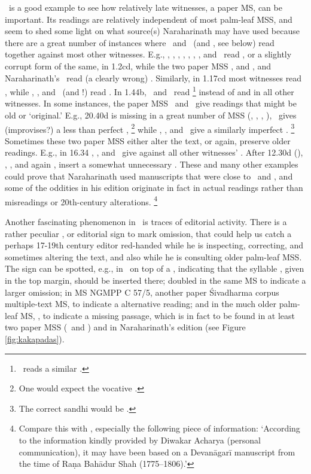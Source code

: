 \msPaperA\ is a good example to see how relatively
late witnesses, a paper MS, can be important. Its readings
are relatively independent of most palm-leaf MSS,
and seem to shed some light on what source(s) 
Naraharinath may have used because there
are a great number of instances where \Ed\ and \msPaperA\
(and \msPaperC, see below) 
read together against most other witnesses. E.g., \msCa, \msCb, \msCc, \msNa, \msNb, \msNc, \msNd, 
and \msM\ read \skt{bhāratasaṃhitām}, or a slightly
corrupt form of the same, in 1.2cd, while the two
paper MSS \msPaperA, and \msPaperC, 
and Naraharinath's \Ed\ read (a clearly wrong)
. Similarly, in 1.17cd most
witnesses read , while 
\msPaperA, \msPaperC, and \Ed\ (and \msM!) read
. In 1.44b, \msPaperA\ and
\Ed\ read %
		\footnote{\msPaperC\ reads a similar
					.}
instead of  and  
in all other witnesses.
In some instances, the paper
MSS \msPaperA\ and \msPaperC\ give readings
that might be old or `original.' E.g., 20.40d is missing
in a great number of MSS (\msCa, \msCb, \msNa, \msNb),
\msNc\ gives (improvises?) a less than perfect 
,%
		 \footnote{One would expect the vocative
		 				.}
while \msPaperA, \msPaperC, and \Ed\ give a similarly imperfect
.%
		 \footnote{The correct sandhi would be
		 				.}
Sometimes these two paper MSS either alter
the text, or again, preserve older readings. 
E.g., in 16.34 \msPaperA, \msPaperC, and \Ed\
give  against all other witnesses'
\skt{maheśvara uvāca}. After 12.30d (),
\msPaperA, \msPaperC, and again \Ed, insert
a somewhat unnecessary \skt{vipula uvāca}. These
and many other examples could prove that
Naraharinath used manuscripts that were close
to \msPaperA\ and \msPaperC,\label{narahari_paperms}
and some of the oddities in his edition originate in fact in 
actual readings rather than misreadings or
20th-century alterations.%
		\footnote{Compare this with 	
					, especially the
					following piece of information:
					`According to the information kindly
					provided by Diwakar Acharya (personal communication),
					it may have been based on a Devanāgarī manuscript 	
					from the time of Raṇa Bahādur Shah (1775--1806).'}

Another fascinating phenomenon in \msPaperA\ is
traces of editorial activity. There is a rather
peculiar \skt{kākapada}, or editorial sign to mark
omission, that could help us catch a perhaps
17-19th century editor red-handed while he is inspecting,
correcting, and sometimes altering the text, and 
also while he is consulting older palm-leaf MSS.
The sign can be spotted, e.g., in \msPaperA\
on top of a , indicating that the syllable , 
given in the top margin,
should be inserted there; 
doubled in the same MS to indicate a larger omission; 
in MS NGMPP C 57/5, another paper Śivadharma corpus
multiple-text MS, to indicate a alternative reading;
and in the much older palm-leaf MS, 
\msNa, to indicate a missing passage,
which is in fact to be found in at least two paper MSS 
(\msPaperA\ and \msPaperC) and in Naraharinath's
edition  (see Figure \ref{fig:kakapadas}).


